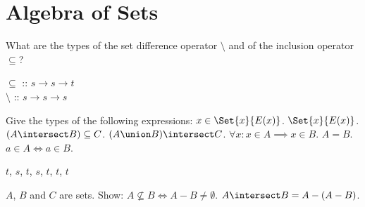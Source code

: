 \section{Algebra of Sets}

\begin{Exercise} [number=13]
  What are the types of the set difference operator $\setminus$ and of the inclusion operator $\subseteq$?
\end{Exercise}

\begin{Answer}
  $\subseteq$ :: $s \rightarrow s \rightarrow t$\\
  $\setminus$ :: $s \rightarrow s \rightarrow s$
\end{Answer}


\begin{Exercise} [number=14]
  Give the types of the following expressions:
  \Question $x \in \Set{x}{E(x)}$.
  \Question $\Set{x}{E(x)}$.
  \Question $(A \intersect B) \subseteq C$.
  \Question $(A \union B) \intersect C$.
  \Question $\forall{x} \colon x \in A \implies x \in B$.
  \Question $A=B$.
  \Question $a \in A \iff a \in B$.
\end{Exercise}

\begin{Answer}
$t$, $s$, $t$, $s$, $t$, $t$, $t$
\end{Answer}

\begin{Exercise} [number=17]
  $A$, $B$ and $C$ are sets. Show:
  \Question $A \nsubseteq B \iff A - B \neq \emptyset$.
  \Question $A \intersect B = A - (A - B)$.
\end{Exercise}

\begin{Answer} [number=17.1]
  \begin{structured_derivation}
  \end{structured_derivation}
\end{Answer}


